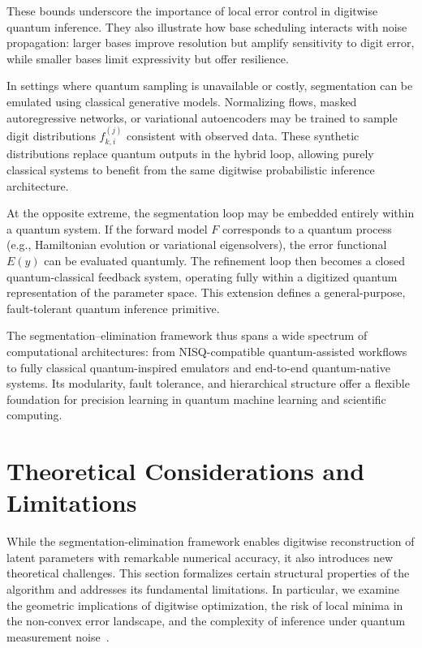 \documentclass[aps,twocolumn,superscriptaddress,nofootinbib]{revtex4}
\begin{document}
These bounds underscore the importance of local error control in digitwise quantum inference. They also illustrate how base scheduling interacts with noise propagation: larger bases improve resolution but amplify sensitivity to digit error, while smaller bases limit expressivity but offer resilience.

In settings where quantum sampling is unavailable or costly, segmentation can be emulated using classical generative models. Normalizing flows, masked autoregressive networks, or variational autoencoders may be trained to sample digit distributions \( f^{(j)}_{k,i} \) consistent with observed data. These synthetic distributions replace quantum outputs in the hybrid loop, allowing purely classical systems to benefit from the same digitwise probabilistic inference architecture.

At the opposite extreme, the segmentation loop may be embedded entirely within a quantum system. If the forward model \( F \) corresponds to a quantum process (e.g., Hamiltonian evolution or variational eigensolvers), the error functional \( E(y) \) can be evaluated quantumly. The refinement loop then becomes a closed quantum-classical feedback system, operating fully within a digitized quantum representation of the parameter space. This extension defines a general-purpose, fault-tolerant quantum inference primitive.

The segmentation--elimination framework thus spans a wide spectrum of computational architectures: from NISQ-compatible quantum-assisted workflows to fully classical quantum-inspired emulators and end-to-end quantum-native systems. Its modularity, fault tolerance, and hierarchical structure offer a flexible foundation for precision learning in quantum machine learning and scientific computing.


\section{Theoretical Considerations and Limitations}
\label{sec:theory}
While the segmentation-elimination framework enables digitwise reconstruction of latent parameters with remarkable numerical accuracy, it also introduces new theoretical challenges. This section formalizes certain structural properties of the algorithm and addresses its fundamental limitations. In particular, we examine the geometric implications of digitwise optimization, the risk of local minima in the non-convex error landscape, and the complexity of inference under quantum measurement noise~\cite{ge2015escaping}.
\end{document}
